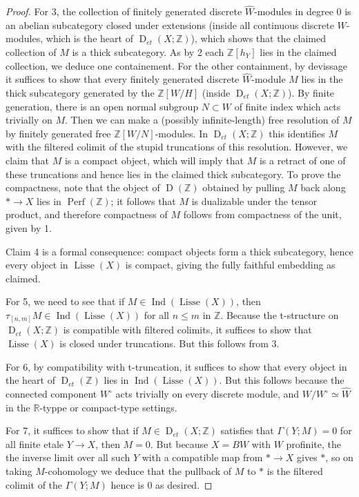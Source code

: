 \documentclass[12pt]{article}
\theoremstyle{definition}
\newcommand{\on}{\operatorname}
\newcommand{\mbb}{\mathbb}
\newcommand{\wh}{\widehat}
\begin{document}
\begin{proof}
For 3, the collection of finitely generated discrete $\wh{W}$-modules in degree $0$ is an abelian subcategory closed under extensions (inside all continuous discrete $W$-modules, which is the heart of $\on{D}_{et}(X;\mbb{Z})$), which shows that the claimed collection of $M$ is a thick subcategory.  As by 2 each $\mbb{Z}[h_Y]$ lies in the claimed collection, we deduce one containement.  For the other containment, by devissage it suffices to show that every finitely generated discrete $\wh{W}$-module $M$ lies in the thick subcategory generated by the $\mbb{Z}[W/H]$ (inside $\on{D}_{et}(X;\mbb{Z})$).  By finite generation, there is an open normal subgroup $N\subset W$ of finite index which acts trivially on $M$.  Then we can make a (possibly infinite-length) free resolution of $M$ by finitely generated free $\mbb{Z}[W/N]$-modules.  In $\on{D}_{et}(X;\mbb{Z})$ this identifies $M$ with the filtered colimit of the stupid truncations of this resolution.  However, we claim that $M$ is a compact object, which will imply that $M$ is a retract of one of these truncations and hence lies in the claimed thick subcategory.  To prove the compactness, note that the object of $\on{D}(\mbb{Z})$ obtained by pulling $M$ back along $\ast \to X$ lies in $\on{Perf}(\mbb{Z})$; it follows that $M$ is dualizable under the tensor product, and therefore compactness of $M$ follows from compactness of the unit, given by 1.

Claim 4 is a formal consequence: compact objects form a thick subcategory, hence every object in $\on{Lisse}(X)$ is compact, giving the fully faithful embedding as claimed.

For 5, we need to see that if $M\in\on{Ind}(\on{Lisse}(X))$, then $\tau_{[n,m]}M\in\on{Ind}(\on{Lisse}(X))$ for all $n\leq m$ in $\mbb{Z}$.  Because the t-structure on $\on{D}_{et}(X;\mbb{Z})$ is compatible with filtered colimits, it suffices to show that $\on{Lisse}(X)$ is closed under truncations.  But this follows from 3.

For 6, by compatibility with t-truncation, it suffices to show that every object in the heart of $\on{D}_{et}(\mbb{Z})$ lies in $\on{Ind}(\on{Lisse}(X))$.  But this follows because the connected component $W^\circ$ acts trivially on every discrete module, and $W/W^\circ\simeq \wh{W}$ in the $\mbb{R}$-typpe or compact-type settings.

For 7, it suffices to show that if $M\in\on{D}_{et}(X;\mbb{Z})$ satisfies that $\Gamma(Y;M)=0$ for all finite etale $Y\to X$, then $M=0$.  But because $X=BW$ with $W$ profinite, the the inverse limit over all such $Y$ with a compatible map from $\ast \to X$ gives $\ast$, so on taking $M$-cohomology we deduce that the pullback of $M$ to $\ast$ is the filtered colimit of the $\Gamma(Y;M)$ hence is $0$ as desired. 
\end{proof}
\end{document}
